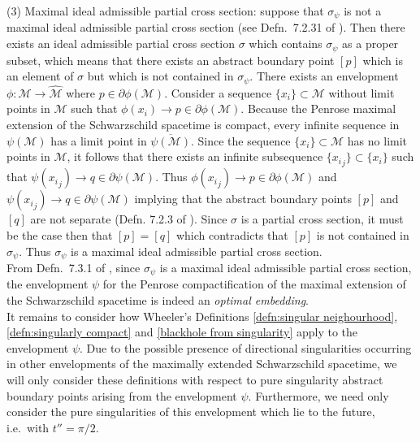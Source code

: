 \documentclass[pdflatex,sn-mathphys-num]{sn-jnl}
\theoremstyle{definition}
\begin{document}
(3) Maximal ideal admissible partial cross section: suppose that $\sigma_{\psi}$ is not a maximal ideal admissible partial cross section (see Defn.\ 7.2.31 of \cite{Barrythesis_2014}). Then there exists an ideal admissible partial cross section $\sigma$ which contains $\sigma_{\psi}$ as a proper subset, which means that there exists an abstract boundary point $[p]$ which is an element of $\sigma$ but which is not contained in $\sigma_{\psi}$. There exists an envelopment $\phi:\mathcal{M} \rightarrow \mathcal{\hat{M}}$ where $p \in \partial\phi(\mathcal{M})$. Consider a sequence $\{x_i\} \subset \mathcal{M}$ without limit points in $\mathcal{M}$ such that $\phi(x_i) \rightarrow p \in \partial\phi(\mathcal{M})$. Because the Penrose maximal extension of the Schwarzschild spacetime is compact, every infinite sequence in $\psi(\mathcal{M})$ has a limit point in $\overline{\psi(\mathcal{M})}$. Since the sequence $\{x_i\} \subset \mathcal{M}$ has no limit points in $\mathcal{M}$, it follows that there exists an infinite subsequence $\{{x_i}_{j}\} \subset \{x_i\}$ such that $\psi({x_i}_{j}) \rightarrow q \in \partial\psi(\mathcal{M})$. Thus $\phi({x_i}_{j}) \rightarrow p \in \partial\phi(\mathcal{M})$ and $\psi({x_i}_{j}) \rightarrow q \in \partial\psi(\mathcal{M})$ implying that the abstract boundary points $[p]$ and $[q]$ are not separate (Defn. 7.2.3 of \cite{Barrythesis_2014}). Since $\sigma$ is a partial cross section, it must be the case then that $[p] = [q]$ which contradicts that $[p]$ is not contained in $\sigma_{\psi}$. Thus $\sigma_{\psi}$ is a maximal ideal admissible partial cross section.\\

From Defn.\ 7.3.1 of \cite{Barrythesis_2014}, since $\sigma_{\psi}$ is a maximal ideal admissible partial cross section, the envelopment $\psi$ for the Penrose compactification of the maximal extension of the Schwarzschild spacetime is indeed an {\it optimal embedding}.\\

It remains to consider how Wheeler's Definitions \ref{defn:singular neighourhood}, \ref{defn:singularly compact} and \ref{blackhole from singularity} apply to the envelopment $\psi$. Due to the possible presence of directional singularities occurring in other envelopments of the maximally extended Schwarzschild spacetime, we will only consider these definitions with respect to pure singularity abstract boundary points arising from the envelopment $\psi$. Furthermore, we need only consider the pure singularities of this envelopment which lie to the future, i.e.\ with $t''=\pi/2$.\\
\end{document}

